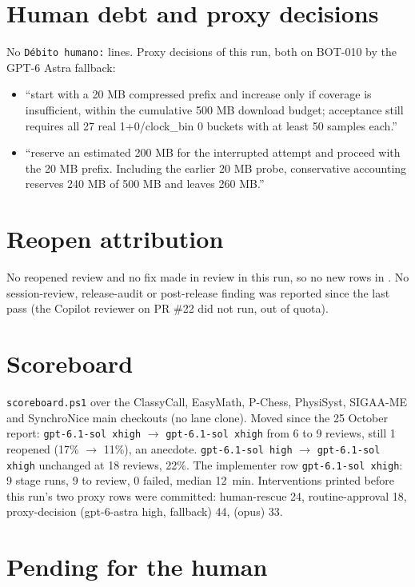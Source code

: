 \documentclass[11pt,a4paper]{article}
\begin{document}
\section*{Human debt and proxy decisions}

No \texttt{Débito humano:} lines. Proxy decisions of this run, both on BOT-010 by the
GPT-6 Astra fallback:

\begin{itemize}
  \item ``start with a 20 MB compressed prefix and increase only if coverage is insufficient,
        within the cumulative 500 MB download budget; acceptance still requires all 27 real
        1+0/clock\_bin 0 buckets with at least 50 samples each.''
  \item ``reserve an estimated 200 MB for the interrupted attempt and proceed with the 20 MB
        prefix. Including the earlier 20 MB probe, conservative accounting reserves 240 MB of
        500 MB and leaves 260 MB.''
\end{itemize}

\section*{Reopen attribution}

No reopened review and no fix made in review in this run, so no new rows in
. No session-review, release-audit or post-release finding was
reported since the last pass (the Copilot reviewer on PR \#22 did not run, out of quota).

\section*{Scoreboard}

\texttt{scoreboard.ps1} over the ClassyCall, EasyMath, P-Chess, PhysiSyst, SIGAA-ME and
SynchroNice main checkouts (no lane clone). Moved since the 25 October report:
\texttt{gpt-6.1-sol xhigh} $\rightarrow$ \texttt{gpt-6.1-sol xhigh} from 6 to 9 reviews, still
1 reopened (17\% $\to$ 11\%), an anecdote. \texttt{gpt-6.1-sol high} $\rightarrow$
\texttt{gpt-6.1-sol xhigh} unchanged at 18 reviews, 22\%. The implementer row
\texttt{gpt-6.1-sol xhigh}: 9 stage runs, 9 to review, 0 failed, median 12~min. Interventions
printed before this run's two proxy rows were committed: human-rescue 24, routine-approval 18,
proxy-decision (gpt-6-astra high, fallback) 44, (opus) 33.

\section*{Pending for the human}
\end{document}

